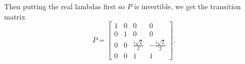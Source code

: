 Then putting the real lambdas first so $P$ is invertible, we get the transition matrix $$P = \begin{bmatrix}
    1&0&0&0\\
    0&1&0&0\\
    0&0&\frac{i\sqrt{2}}{2} & - \frac{i\sqrt{2}}{2} \\
    0&0&1&1
    \end{bmatrix}.$$